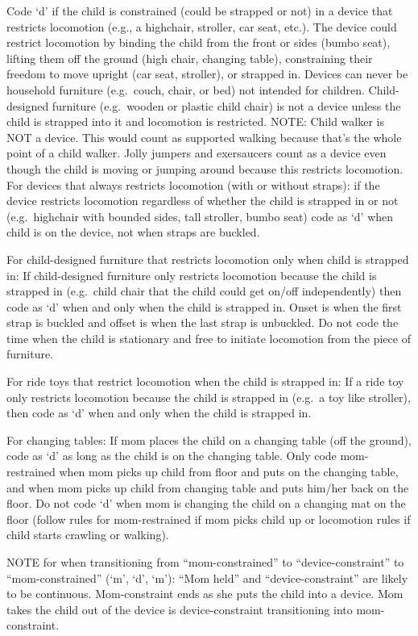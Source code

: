\documentclass[
]{book}
\begin{document}
Code `d' if the child is constrained (could be strapped or not) in a device that restricts locomotion (e.g., a highchair, stroller, car seat, etc.). The device could restrict locomotion by binding the child from the front or sides (bumbo seat), lifting them off the ground (high chair, changing table), constraining their freedom to move upright (car seat, stroller), or strapped in. Devices can never be household furniture (e.g.~couch, chair, or bed) not intended for children. Child-designed furniture (e.g.~wooden or plastic child chair) is not a device unless the child is strapped into it and locomotion is restricted.
NOTE: Child walker is NOT a device. This would count as supported walking because that's the whole point of a child walker. Jolly jumpers and exersaucers count as a device even though the child is moving or jumping around because this restricts locomotion.
For devices that always restricts locomotion (with or without straps): if the device restricts locomotion regardless of whether the child is strapped in or not (e.g.~highchair with bounded sides, tall stroller, bumbo seat) code as `d' when child is on the device, not when straps are buckled.

For child-designed furniture that restricts locomotion only when child is strapped in: If child-designed furniture only restricts locomotion because the child is strapped in (e.g.~child chair that the child could get on/off independently) then code as `d' when and only when the child is strapped in. Onset is when the first strap is buckled and offset is when the last strap is unbuckled. Do not code the time when the child is stationary and free to initiate locomotion from the piece of furniture.

For ride toys that restrict locomotion when the child is strapped in: If a ride toy only restricts locomotion because the child is strapped in (e.g.~a toy like stroller), then code as `d' when and only when the child is strapped in.

For changing tables: If mom places the child on a changing table (off the ground), code as `d' as long as the child is on the changing table. Only code mom-restrained when mom picks up child from floor and puts on the changing table, and when mom picks up child from changing table and puts him/her back on the floor. Do not code `d' when mom is changing the child on a changing mat on the floor (follow rules for mom-restrained if mom picks child up or locomotion rules if child starts crawling or walking).

NOTE for when transitioning from ``mom-constrained'' to ``device-constraint'' to ``mom-constrained'' (`m', `d', `m'): ``Mom held'' and ``device-constraint'' are likely to be continuous. Mom-constraint ends as she puts the child into a device. Mom takes the child out of the device is device-constraint transitioning into mom-constraint.
\end{document}
